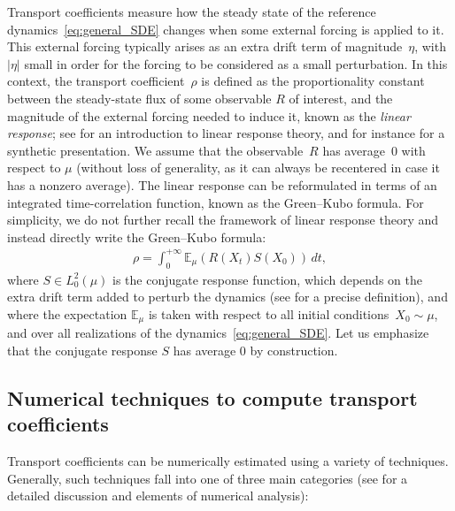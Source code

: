 \documentclass[11pt]{article}
\newcommand{\E}{\mathbb{E}}
\theoremstyle{definition}
\begin{document}
Transport coefficients measure how the steady state of the reference dynamics~\eqref{eq:general_SDE} changes when some external forcing is applied to it. This external forcing typically arises as an extra drift term of magnitude~$\eta$, with~$|\eta|$ small in order for the forcing to be considered as a small perturbation. In this context, the transport coefficient~$\rho$ is defined as the proportionality constant between the steady-state flux of some observable $R$ of interest, and the magnitude of the external forcing needed to induce it, known as the \emph{linear response}; see \cite[Chapter 8]{chandler1987} for an introduction to linear response theory, and for instance \cite[Section 2]{spacek2023} for a synthetic presentation. We assume that the observable~$R$ has average~0 with respect to $\mu$ (without loss of generality, as it can always be recentered in case it has a nonzero average). The linear response can be reformulated in terms of an integrated time-correlation function, known as the Green--Kubo formula. For simplicity, we do not further recall the framework of linear response theory and instead directly write the Green--Kubo formula:
\begin{align}
	\rho = \int_0^{+\infty} \E_\mu(R(X_t) S(X_0)) \, dt,\label{eq:gk}
\end{align}
where $S \in L^2_0(\mu)$ is the conjugate response function, which depends on the extra drift term added to perturb the dynamics (see \cite[Section 5.2.3]{lelievre2016} for a precise definition), and where the expectation $\E_\mu$ is taken with respect to all initial conditions~$X_0\sim \mu$, and over all realizations of the dynamics~\eqref{eq:general_SDE}. Let us emphasize that the conjugate response $S$ has average 0 by construction.

\subsection{Numerical techniques to compute transport coefficients}
\label{subsec:num_tech}
Transport coefficients can be numerically estimated using a variety of techniques. Generally, such techniques fall into one of three main categories (see \cite{lelievre2016,stoltz2024} for a detailed discussion and elements of numerical analysis):
\end{document}
